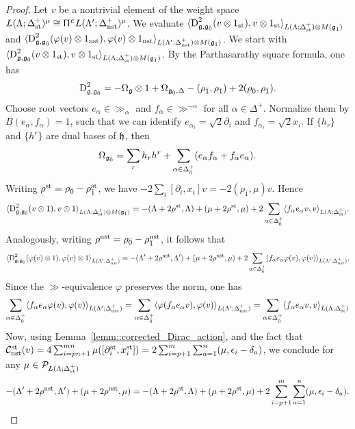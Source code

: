 \begin{proof}
  Let $v$ be a nontrivial element of the weight space $L(\Lambda;\Delta_{{\text{st}}}^{+})^{\mu} \cong  \Uppi^{\upepsilon}L(\Lambda';\Delta_{{\text{nst}}}^{+})^{\mu}$. We evaluate
 $\langle\operatorname{D}_{{\mathfrak{g}},{\mathfrak{g}_{\bar{0}}}}^{2}(v\otimes1_{{\text{st}}}),v\otimes1_{{\text{st}}}\rangle_{L(\Lambda;\Delta^{+}_{{\text{st}}})\otimes M({\mathfrak{g}_{\bar{1}}})}$ and $\langle\operatorname{D}_{{\mathfrak{g}},{\mathfrak{g}_{\bar{0}}}}^{2}(\varphi(v)\otimes1_{{\text{nst}}}),\varphi(v)\otimes1_{{\text{nst}}}\rangle_{L(\Lambda';\Delta^{+}_{{\text{nst}}})\otimes M({\mathfrak{g}_{\bar{1}}})}$. We start with $\langle\operatorname{D}_{{\mathfrak{g}},{\mathfrak{g}_{\bar{0}}}}^{2}(v\otimes1_{{\text{st}}}),v\otimes1_{{\text{st}}}\rangle_{L(\Lambda;\Delta^{+}_{{\text{st}}})\otimes M({\mathfrak{g}_{\bar{1}}})}$. By the Parthasarathy square formula, one has
 \[
 \operatorname{D}_{{\mathfrak{g}},{\mathfrak{g}_{\bar{0}}}}^{2}
 =
 -\Omega_{{\mathfrak{g}}}\otimes1+\Omega_{{\mathfrak{g}_{\bar{0}}},\Delta}-(\rho_{\bar1},\rho_{\bar1})
+
2(\rho_{\bar0},\rho_{\bar1}).
 \]
Choose root vectors $e_\alpha\in\gg_\alpha$ and $f_\alpha\in\gg^{-\alpha}$ for all $\alpha\in\Delta^+$. Normalize them by $B(e_\alpha,f_\alpha)=1$, such that we can identify $e_{\alpha_i}=\sqrt{2}\partial_i$ and $f_{\alpha_i}=\sqrt{2}x_i$. If $\{h_r\}$ and $\{h^r\}$ are dual bases of ${\mathfrak h}$, then
 \[
 \Omega_{{\mathfrak{g}_{\bar{0}}}}
 =
 \sum_r h_rh^r
 +
 \sum_{\alpha\in\Delta_{\bar0}^+}
 (e_\alpha f_\alpha+f_\alpha e_\alpha).
 \]
 Writing $\rho^{{\text{st}}}=\rho_{\bar0}-\rho_{\bar1}^{{\text{st}}}$, we have
 $-2\sum_i[\partial_i,x_i]v=-2(\rho_{\bar1},\mu)v$. Hence
 \[
 \begin{aligned}
\langle\operatorname{D}_{{\mathfrak{g}},{\mathfrak{g}_{\bar{0}}}}^{2}(v\otimes1),v\otimes1\rangle_{L(\Lambda;\Delta_{{\text{st}}}^{+})\otimes M({\mathfrak{g}_{\bar{1}}})}
 =
 -(\Lambda+2\rho^{{\text{st}}},\Lambda)+(\mu+2\rho^{{\text{st}}},\mu) +2\sum_{\alpha\in\Delta_{\bar0}^+}
 \langle f_\alpha e_\alpha v,v\rangle_{L(\Lambda;\Delta_{{\text{st}}}^{+})}.
 \end{aligned}
 \]
 Analogously, writing $\rho^{{\text{nst}}}=\rho_{\bar{0}}-\rho_{\bar{1}}^{{\text{nst}}}$, it follows that
 \[
 \begin{aligned}
\langle\operatorname{D}_{{\mathfrak{g}},{\mathfrak{g}_{\bar{0}}}}^{2}(\varphi(v)\otimes1),\varphi(v)\otimes1\rangle_{L(\Lambda';\Delta_{{\text{nst}}}^{+})}
 =
 -(\Lambda'+2\rho^{{\text{nst}}},\Lambda')+(\mu+2\rho^{{\text{nst}}},\mu) +2\sum_{\alpha\in\Delta_{\bar0}^+}
 \langle f_\alpha e_\alpha \varphi(v),\varphi(v)\rangle_{L(\Lambda';\Delta_{{\text{nst}}}^{+})}.
 \end{aligned}
 \]
Since the $\gg$-equivalence $\varphi$ preserves the norm, one has
\[
\sum_{\alpha\in \Delta_{\bar{0}}^{+}}\langle f_{\alpha}e_{\alpha}\varphi(v),\varphi(v)\rangle_{L(\Lambda';\Delta_{{\text{nst}}}^{+})} = \sum_{\alpha\in \Delta_{\bar{0}}^{+}}\langle \varphi(f_{\alpha}e_{\alpha}v),\varphi(v)\rangle_{L(\Lambda';\Delta_{{\text{nst}}}^{+})}= \sum_{\alpha\in \Delta_{\bar{0}}^{+}}\langle f_{\alpha}e_{\alpha}v,v\rangle_{L(\Lambda;\Delta_{{\text{st}}}^{+})}
\]
Now, using Lemma~\ref{lemm::corrected_Dirac_action}, and the fact that $\mathcal{C}^{{\text{st}}}_{{\text{nst}}}(v)=4\sum_{i=pn+1}^{mn}\mu([\partial_{i}^{{\text{st}}},x_{i}^{{\text{st}}}])=2\sum_{i=p+1}^{m}\sum_{a=1}^{n}(\mu,\epsilon_{i}-\delta_{a})$, we conclude for any $\mu \in \mathcal{P}_{L(\Lambda;\Delta_{{\text{st}}}^{+})}$
 \[
 -(\Lambda'+2\rho^{{\text{nst}}},\Lambda')+(\mu+2\rho^{{\text{nst}}},\mu)= -(\Lambda+2\rho^{{\text{st}}},\Lambda)+(\mu+2\rho^{{\text{st}}},\mu)+2\sum_{i=p+1}^{m}\sum_{a=1}^{n}(\mu,\epsilon_{i}-\delta_{a}).\qedhere
 \]
\end{proof}

